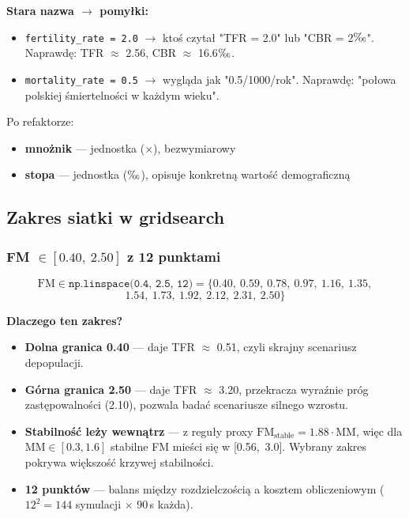 \documentclass[11pt,a4paper]{article}
\newcommand{\promile}{\ensuremath{\text{\textperthousand}}}
\begin{document}
\textbf{Stara nazwa $\to$ pomyłki:}
\begin{itemize}
  \item \texttt{fertility\_rate = 2.0} $\to$ ktoś czytał "TFR = 2.0" lub "CBR = 2\promile{}". Naprawdę: TFR $\approx$ 2.56, CBR $\approx$ 16.6\promile{}.
  \item \texttt{mortality\_rate = 0.5} $\to$ wygląda jak "0.5/1000/rok". Naprawdę: "połowa polskiej śmiertelności w każdym wieku".
\end{itemize}

Po refaktorze:
\begin{itemize}
  \item \textbf{mnożnik} --- jednostka ($\times$), bezwymiarowy
  \item \textbf{stopa} --- jednostka (\promile{}), opisuje konkretną wartość demograficzną
\end{itemize}

\subsection{Zakres siatki w gridsearch}

\subsubsection{FM $\in [0.40,\ 2.50]$ z 12 punktami}

\begin{formulabox}
\[
\text{FM} \in \texttt{np.linspace(0.4, 2.5, 12)} = \{0.40,\ 0.59,\ 0.78,\ 0.97,\ 1.16,\ 1.35,\]
\[1.54,\ 1.73,\ 1.92,\ 2.12,\ 2.31,\ 2.50\}
\]
\end{formulabox}

\textbf{Dlaczego ten zakres?}
\begin{itemize}[leftmargin=*]
  \item \textbf{Dolna granica 0.40} --- daje TFR $\approx$ 0.51, czyli skrajny scenariusz depopulacji.
  \item \textbf{Górna granica 2.50} --- daje TFR $\approx$ 3.20, przekracza wyraźnie próg zastępowalności (2.10), pozwala badać scenariusze silnego wzrostu.
  \item \textbf{Stabilność leży wewnątrz} --- z reguły proxy $\text{FM}_{\text{stable}} = 1.88 \cdot \text{MM}$, więc dla $\text{MM} \in [0.3, 1.6]$ stabilne FM mieści się w \mbox{[0.56, 3.0]}. Wybrany zakres pokrywa większość krzywej stabilności.
  \item \textbf{12 punktów} --- balans między rozdzielczością a kosztem obliczeniowym ($12^2 = 144$ symulacji $\times$ 90\,s każda).
\end{itemize}
\end{document}
